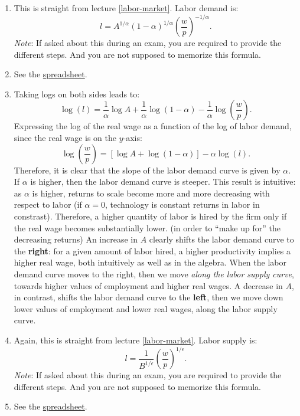 \documentclass[]{book}
\theoremstyle{definition}
\theoremstyle{definition}
\theoremstyle{definition}
\theoremstyle{remark}
\begin{document}
\begin{enumerate}
\def\labelenumi{\arabic{enumi}.}
\item
  This is straight from lecture \ref{labor-market}. Labor demand is:
  \[l=A^{1/\alpha}(1-\alpha)^{1/\alpha}\left(\frac{w}{p}\right)^{-1/\alpha}.\]
  \emph{Note}: If asked about this during an exam, you are required to
  provide the different steps. And you are not supposed to memorize this
  formula.
\item
  See the
  \href{https://docs.google.com/spreadsheets/d/1h9JJD8K2_IE166gdj78waf0zu4YDY9Rp3r5oiJR_06s/edit?usp=sharing}{spreadsheet}.
\item
  Taking logs on both sides leads to:
  \[\log(l)=\frac{1}{\alpha}\log A+\frac{1}{\alpha}\log(1-\alpha)-\frac{1}{\alpha}\log\left(\frac{w}{p}\right).\]
  Expressing the log of the real wage as a function of the log of labor
  demand, since the real wage is on the \(y\)-axis:
  \[\boxed{\log\left(\frac{w}{p}\right) = \left[\log A + \log(1-\alpha)\right] -\alpha \log(l)}.\]
  Therefore, it is clear that the slope of the labor demand curve is
  given by \(\alpha\). If \(\alpha\) is higher, then the labor demand
  curve is steeper. This result is intuitive: as \(\alpha\) is higher,
  returns to scale become more and more decreasing with respect to labor
  (if \(\alpha=0\), technology is constant returns in labor in
  constrast). Therefore, a higher quantity of labor is hired by the firm
  only if the real wage becomes substantially lower. (in order to ``make
  up for'' the decreasing returns) An increase in \(A\) clearly shifts
  the labor demand curve to the \textbf{right}: for a given amount of
  labor hired, a higher productivity implies a higher real wage, both
  intuitively as well as in the algebra. When the labor demand curve
  moves to the right, then we move \emph{along the labor supply curve},
  towards higher values of employment and higher real wages. A decrease
  in \(A\), in contrast, shifts the labor demand curve to the
  \textbf{left}, then we move down lower values of employment and lower
  real wages, along the labor supply curve.
\item
  Again, this is straight from lecture \ref{labor-market}. Labor supply
  is:
  \[l=\frac{1}{B^{1/\epsilon}}\left(\frac{w}{p}\right)^{1/\epsilon}.\]
  \emph{Note}: If asked about this during an exam, you are required to
  provide the different steps. And you are not supposed to memorize this
  formula.
\item
  See the
  \href{https://docs.google.com/spreadsheets/d/1h9JJD8K2_IE166gdj78waf0zu4YDY9Rp3r5oiJR_06s/edit?usp=sharing}{spreadsheet}.

\end{enumerate}
\end{document}
